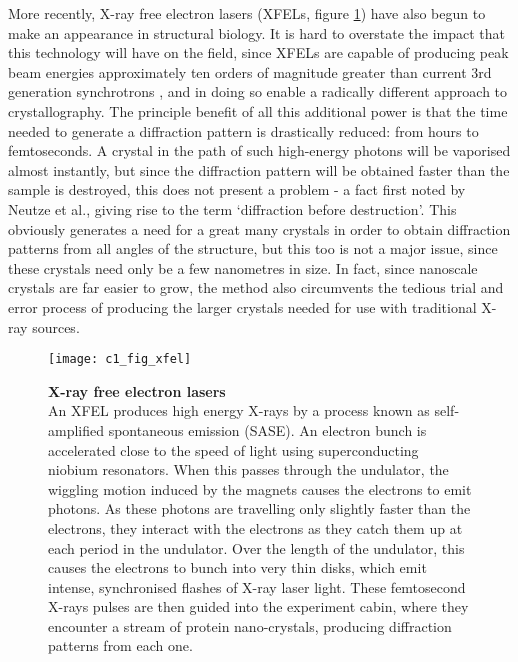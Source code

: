 \documentclass[a4paper,11pt,twoside,openright]{scrbook}
\begin{document}
More recently, X-ray free electron lasers (XFELs, figure \ref{figure:xfels}) have also begun to make an appearance in structural biology. It is hard to overstate the impact that this technology will have on the field, since XFELs are capable of producing peak beam energies approximately ten orders of magnitude greater than current 3rd generation synchrotrons \cite{Shi2014}, and in doing so enable a radically different approach to crystallography. The principle benefit of all this additional power is that the time needed to generate a diffraction pattern is drastically reduced: from hours to femtoseconds. A crystal in the path of such high-energy photons will be vaporised almost instantly, but since the diffraction pattern will be obtained faster than the sample is destroyed, this does not present a problem - a fact first noted by Neutze et al.\cite{Neutze2000}, giving rise to the term `diffraction before destruction'. This obviously generates a need for a great many crystals in order to obtain diffraction patterns from all angles of the structure, but this too is not a major issue, since these crystals need only be a few nanometres in size. In fact, since nanoscale crystals are far easier to grow, the method also circumvents the tedious trial and error process of producing the larger crystals needed for use with traditional X-ray sources.

\begin{figure}[h]
    \texttt{[image: c1\_fig\_xfel]}
    \caption[X-ray free electron lasers]{\sffamily \textbf{X-ray free electron lasers} \\ \small An XFEL produces high energy X-rays by a process known as self-amplified spontaneous emission (SASE). An electron bunch is accelerated close to the speed of light using superconducting niobium resonators. When this passes through the undulator, the wiggling motion induced by the magnets causes the electrons to emit photons. As these photons are travelling only slightly faster than the electrons, they interact with the electrons as they catch them up at each period in the undulator. Over the length of the undulator, this causes the electrons to bunch into very thin disks, which emit intense, synchronised flashes of X-ray laser light. These femtosecond X-rays pulses are then guided into the experiment cabin, where they encounter a stream of protein nano-crystals, producing diffraction patterns from each one.}
    \label{figure:xfels}
\end{figure}
\end{document}
